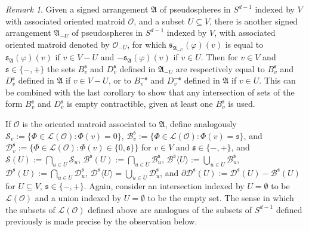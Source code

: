 \documentclass[a4paper,11pt,reqno, english]{amsart}
\theoremstyle{definition}
\theoremstyle{remark}
\newtheorem{remark}[theorem]{Remark}
\begin{document}
\begin{remark}\label{rmk:reorientation}
    Given a signed arrangement $\mathfrak{A}$ of pseudospheres in $S^{d-1}$ indexed by $V$ with associated oriented matroid $\mathscr{O}$, and a subset $U\subseteq V$, there is another signed arrangement $\mathfrak{A}_{-U}$ of pseudospheres in $S^{d-1}$ indexed by $V$, with associated oriented matroid denoted by $\mathscr{O}_{-U}$, for which $\mathfrak{s}_{\mathfrak{A}_{-U}}(\varphi)(v)$ is equal to $\mathfrak{s}_\mathfrak{A}(\varphi)(v)$ if $v\in V-U$ and $-\mathfrak{s}_\mathfrak{A}(\varphi)(v)$ if $v\in U$. Then for $v\in V$ and $\mathfrak{s}\in\{-,+\}$ the sets $B^\mathfrak{s}_v$ and $D^\mathfrak{s}_v$ defined in $\mathfrak{A}_{-U}$ are respectively equal to $B^\mathfrak{s}_v$ and $D^\mathfrak{s}_v$ defined in $\mathfrak{A}$ if $v\in V-U$, or to $B^{-\mathfrak{s}}_v$ and $D^{-\mathfrak{s}}_v$ defined in $\mathfrak{A}$ if $v\in U$. This can be combined with the last corollary to show that any intersection of sets of the form $B^{\mathfrak{s}}_v$ and $D^\mathfrak{s}_v$ is empty contractible, given at least one $B^\mathfrak{s}_v$ is used.
\end{remark}
If $\mathscr{O}$ is the oriented matroid associated to $\mathfrak{A}$, define analogously $\mathscr{S}_v:=\{\Phi\in\mathscr{L}(\mathscr{O}):\Phi(v)=0\}$, $\mathscr{B}^\mathfrak{s}_v:=\{\Phi\in\mathscr{L}(\mathscr{O}):\Phi(v)=\mathfrak{s}\}$, and $\mathscr{D}^\mathfrak{s}_v:=\{\Phi\in\mathscr{L}(\mathscr{O}):\Phi(v)\in\{0,\mathfrak{s}\}\}$ for $v\in V$ and $\mathfrak{s}\in\{-,+\}$, and $\mathscr{S}(U):=\bigcap_{u\in U}\mathscr{S}_u$, $\mathscr{B}^\mathfrak{s}(U):=\bigcap_{u\in U}\mathscr{B}^\mathfrak{s}_u$, $\mathscr{B}^\mathfrak{s}\langle U\rangle:=\bigcup_{u\in U}\mathscr{B}^\mathfrak{s}_u$, $\mathscr{D}^\mathfrak{s}(U):=\bigcap_{u\in U}\mathscr{D}^\mathfrak{s}_u$, $\mathscr{D}^\mathfrak{s}\langle U\rangle=\bigcup_{u\in U}\mathscr{D}^\mathfrak{s}_u$, and $\partial\mathscr{D}^\mathfrak{s}(U):=\mathscr{D}^\mathfrak{s}(U)-\mathscr{B}^\mathfrak{s}(U)$ for $U\subseteq V$, $\mathfrak{s}\in\{-,+\}$. Again, consider an intersection indexed by $U=\emptyset$ to be $\mathscr{L}(\mathscr{O})$ and a union indexed by $U=\emptyset$ to be the empty set. The sense in which the subsets of $\mathscr{L}(\mathscr{O})$ defined above are analogues of the subsets of $S^{d-1}$ defined previously is made precise by the observation below.
\end{document}

